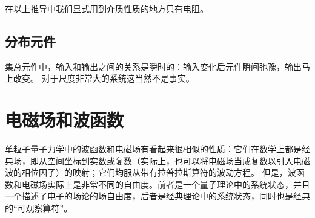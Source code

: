 在以上推导中我们显式用到介质性质的地方只有电阻。

\subsection{分布元件}

集总元件中，输入和输出之间的关系是瞬时的：输入变化后元件瞬间弛豫，输出马上改变。
对于尺度非常大的系统这当然不是事实。

\section{电磁场和波函数}

单粒子量子力学中的波函数和电磁场有看起来很相似的性质：它们在数学上都是经典场，即从空间坐标到实数或复数（实际上，也可以将电磁场当成复数以引入电磁波的相位因子）的映射；它们均服从带有拉普拉斯算符的波动方程。
但是，波函数和电磁场实际上是非常不同的自由度。前者是一个量子理论中的系统状态，并且一个描述了电子的场论的场自由度，后者是经典理论中的系统状态，同时也是经典的“可观察算符”。


